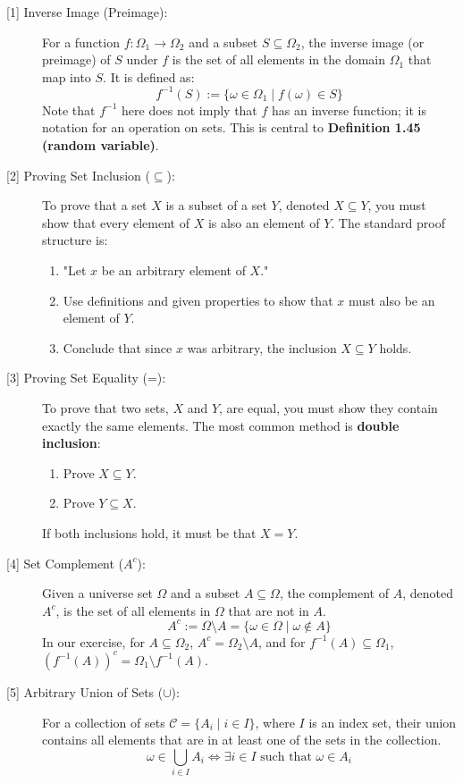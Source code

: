 \documentclass[11pt,a4paper]{article}
\begin{document}
\begin{description}
    \item[\hypertarget{note1}{[1] Inverse Image (Preimage):}] For a function $f: \Omega_1 \to \Omega_2$ and a subset $S \subseteq \Omega_2$, the inverse image (or preimage) of $S$ under $f$ is the set of all elements in the domain $\Omega_1$ that map into $S$. It is defined as:
    \[ f^{-1}(S) := \{\omega \in \Omega_1 \mid f(\omega) \in S\} \]
    Note that $f^{-1}$ here does not imply that $f$ has an inverse function; it is notation for an operation on sets. This is central to \textbf{Definition 1.45 (random variable)}.

    \item[\hypertarget{note2}{[2] Proving Set Inclusion ($\subseteq$):}] To prove that a set $X$ is a subset of a set $Y$, denoted $X \subseteq Y$, you must show that every element of $X$ is also an element of $Y$. The standard proof structure is:
    \begin{enumerate}
        \item "Let $x$ be an arbitrary element of $X$."
        \item Use definitions and given properties to show that $x$ must also be an element of $Y$.
        \item Conclude that since $x$ was arbitrary, the inclusion $X \subseteq Y$ holds.
    \end{enumerate}

    \item[\hypertarget{note3}{[3] Proving Set Equality (=):}] To prove that two sets, $X$ and $Y$, are equal, you must show they contain exactly the same elements. The most common method is \textbf{double inclusion}:
    \begin{enumerate}
        \item Prove $X \subseteq Y$.
        \item Prove $Y \subseteq X$.
    \end{enumerate}
    If both inclusions hold, it must be that $X = Y$.

    \item[\hypertarget{note4}{[4] Set Complement ($A^c$):}] Given a universe set $\Omega$ and a subset $A \subseteq \Omega$, the complement of $A$, denoted $A^c$, is the set of all elements in $\Omega$ that are not in $A$.
    \[ A^c := \Omega \setminus A = \{\omega \in \Omega \mid \omega \notin A\} \]
    In our exercise, for $A \subseteq \Omega_2$, $A^c = \Omega_2 \setminus A$, and for $f^{-1}(A) \subseteq \Omega_1$, $(f^{-1}(A))^c = \Omega_1 \setminus f^{-1}(A)$.

    \item[\hypertarget{note5}{[5] Arbitrary Union of Sets ($\cup$):}] For a collection of sets $\mathcal{C} = \{A_i \mid i \in I\}$, where $I$ is an index set, their union contains all elements that are in at least one of the sets in the collection.
    \[ \omega \in \bigcup_{i \in I} A_i \iff \exists i \in I \text{ such that } \omega \in A_i \]
\end{description}
\end{document}
